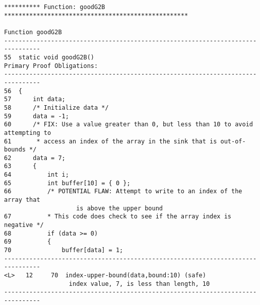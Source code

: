\documentclass[11pt]{article}
\begin{document}
\begin{scriptsize}
\begin{verbatim}
********** Function: goodG2B ***************************************************

Function goodG2B
--------------------------------------------------------------------------------
55  static void goodG2B()
Primary Proof Obligations:
--------------------------------------------------------------------------------
56  {
57      int data;
58      /* Initialize data */
59      data = -1;
60      /* FIX: Use a value greater than 0, but less than 10 to avoid attempting to
61       * access an index of the array in the sink that is out-of-bounds */
62      data = 7;
63      {
64          int i;
65          int buffer[10] = { 0 };
66          /* POTENTIAL FLAW: Attempt to write to an index of the array that 
                    is above the upper bound
67          * This code does check to see if the array index is negative */
68          if (data >= 0)
69          {
70              buffer[data] = 1;
--------------------------------------------------------------------------------
<L>   12     70  index-upper-bound(data,bound:10) (safe)
                  index value, 7, is less than length, 10
--------------------------------------------------------------------------------
\end{verbatim}
\end{scriptsize}
\end{document}

